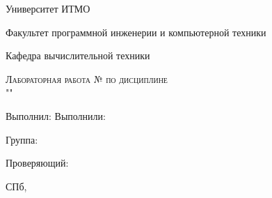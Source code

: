 \begin{titlepage}
	\begin{center}
		\large
		Университет ИТМО

		\vspace{0.25cm}
		
		Факультет программной инженерии и компьютерной техники
		
		Кафедра вычислительной техники
		\vfill
		
		\textsc{Лабораторная работа  № \labnum{} по дисциплине \\"\labsubj" \ifisname\small \\ \labname \fi}
			
		\bigskip
	\end{center}
	\vfill
	\vfill
	
	\begin{flushright}
	\ifisone
	Выполнил: \labauthor
	\else
	Выполнили: \labauthor
	\fi

	\vspace{0.25cm}
	Группа: \labgroup
			
	\vspace{0.25cm}
	\ifisinsp
	Проверяющий: \labinsp
	\fi
	\end{flushright}
	\vfill
	
	\begin{center}
	СПб, \the\year
	\end{center}
\end{titlepage}